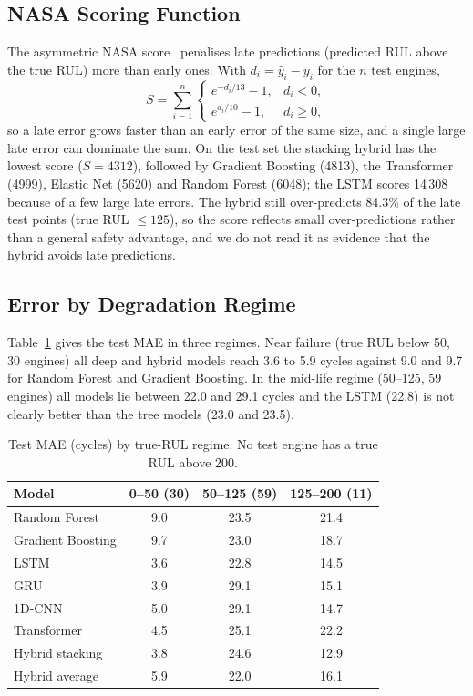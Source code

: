 \subsection{NASA Scoring Function}
The asymmetric NASA score~\cite{saxena_2008_damage_prognosis} penalises late predictions (predicted RUL above the true RUL) more than early ones.  With $d_i=\hat y_i-y_i$ for the $n$ test engines,
\begin{equation}
S=\sum_{i=1}^{n}\begin{cases}e^{-d_i/13}-1, & d_i<0,\\ e^{d_i/10}-1, & d_i\ge 0,\end{cases}
\end{equation}
so a late error grows faster than an early error of the same size, and a single large late error can dominate the sum.  On the test set the stacking hybrid has the lowest score ($S=4312$), followed by Gradient Boosting (4813), the Transformer (4999), Elastic Net (5620) and Random Forest (6048); the LSTM scores 14\,308 because of a few large late errors.  The hybrid still over-predicts 84.3\% of the late test points (true RUL $\le125$), so the score reflects small over-predictions rather than a general safety advantage, and we do not read it as evidence that the hybrid avoids late predictions.

\subsection{Error by Degradation Regime}
Table~\ref{tab:bands} gives the test MAE in three regimes.  Near failure (true RUL below 50, 30 engines) all deep and hybrid models reach 3.6 to 5.9 cycles against 9.0 and 9.7 for Random Forest and Gradient Boosting.  In the mid-life regime (50--125, 59 engines) all models lie between 22.0 and 29.1 cycles and the LSTM (22.8) is not clearly better than the tree models (23.0 and 23.5).

\begin{table}[t]
\centering
\caption{Test MAE (cycles) by true-RUL regime. No test engine has a true RUL above 200.}
\label{tab:bands}
\footnotesize
\begin{tabular}{lccc}
\toprule
Model & 0--50 (30) & 50--125 (59) & 125--200 (11)\\
\midrule
Random Forest & 9.0 & 23.5 & 21.4\\
Gradient Boosting & 9.7 & 23.0 & 18.7\\
LSTM & 3.6 & 22.8 & 14.5\\
GRU & 3.9 & 29.1 & 15.1\\
1D-CNN & 5.0 & 29.1 & 14.7\\
Transformer & 4.5 & 25.1 & 22.2\\
Hybrid stacking & 3.8 & 24.6 & 12.9\\
Hybrid average & 5.9 & 22.0 & 16.1\\
\bottomrule
\end{tabular}
\end{table}

